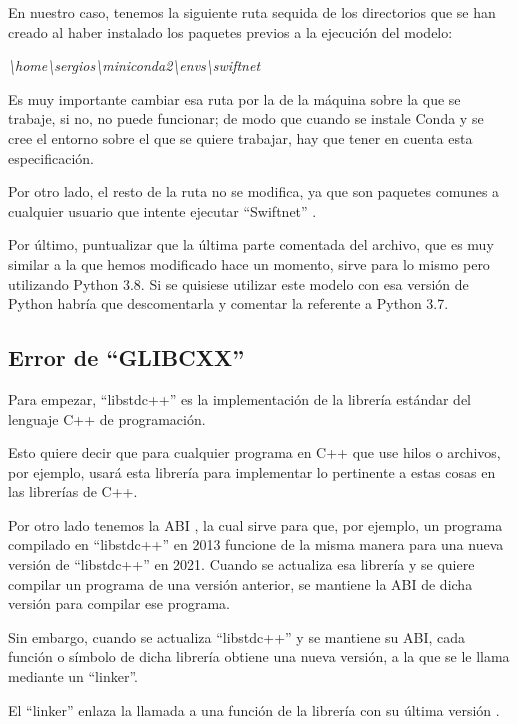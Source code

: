 En nuestro caso, tenemos la siguiente ruta sequida de los directorios que se han creado al haber instalado los paquetes previos a la ejecución del modelo:

\begin{center}
\textit{\textbackslash{home}\textbackslash{sergios}\textbackslash{miniconda2}\textbackslash{envs}\textbackslash{swiftnet}}
\end{center}

Es muy importante cambiar esa ruta por la de la máquina sobre la que se trabaje, si no, no puede funcionar; de modo que cuando se instale Conda y se cree el entorno sobre el que se quiere trabajar, hay que tener en cuenta esta especificación.

Por otro lado, el resto de la ruta no se modifica, ya que son paquetes comunes a cualquier usuario que intente ejecutar ``Swiftnet'' \cite{swiftnet}.

Por último, puntualizar que la última parte comentada del archivo, que es muy similar a la que hemos modificado hace un momento, sirve para lo mismo pero utilizando Python 3.8. Si se quisiese utilizar este modelo con esa versión de Python habría que descomentarla y comentar la referente a Python 3.7.

\subsection{Error de ``GLIBCXX''}

Para empezar, ``libstdc++'' \cite{glibcxx} es la implementación de la librería estándar del lenguaje C++ de programación.

Esto quiere decir que para cualquier programa en C++ que use hilos o archivos, por ejemplo, usará esta librería para implementar lo pertinente a estas cosas en las librerías de C++.

Por otro lado tenemos la \ac{ABI} \cite{glibcxx}, la cual sirve para que, por ejemplo, un programa compilado en ``libstdc++'' en 2013 funcione de la misma manera para una nueva versión de ``libstdc++'' en 2021. Cuando se actualiza esa librería y se quiere compilar un programa de una versión anterior, se mantiene la ABI de dicha versión para compilar ese programa.

Sin embargo, cuando se actualiza ``libstdc++'' y se mantiene su ABI, cada función o símbolo de dicha librería obtiene una nueva versión, a la que se le llama mediante un ``linker''.

El ``linker'' enlaza la llamada a una función de la librería con su última versión \cite{glibcxx}.

